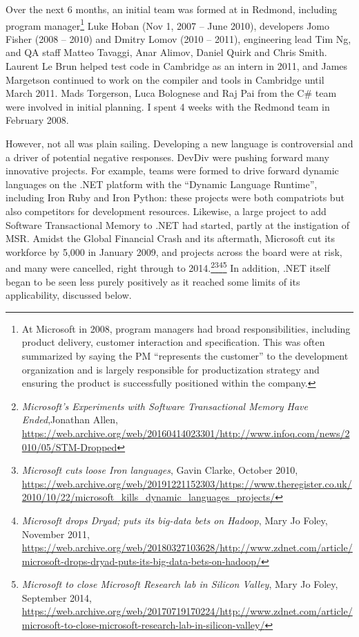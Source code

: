 \documentclass[acmsmall]{acmart}\settopmatter{}
\begin{document}
Over the next 6 months, an initial team was formed at in Redmond, including program
manager\footnote{At Microsoft in 2008, program managers had broad responsibilities, including product delivery,
customer interaction and specification. This was often summarized by saying the PM “represents the customer” to
the development organization and is largely responsible for productization strategy and ensuring the product is
successfully positioned within the company.} Luke Hoban  (Nov 1, 2007 -- June 2010), developers
Jomo Fisher (2008 -- 2010) and Dmitry Lomov (2010 -- 2011), engineering lead Tim Ng, and QA staff Matteo Tavaggi, Anar Alimov, Daniel Quirk and
Chris Smith.  Laurent Le Brun helped test code in Cambridge as an intern in 2011, and James Margetson
continued to work on the compiler and tools in Cambridge until March 2011.  Mads Torgerson, Luca Bolognese
and Raj Pai from the C\# team were involved in initial planning. I spent 4 weeks with the Redmond team in February 2008.

However, not all was plain sailing.  Developing a new language is controversial and a driver of potential
negative responses. DevDiv were pushing forward many innovative projects. For example, teams
were formed to drive forward dynamic languages on the .NET platform with the “Dynamic Language Runtime”, including
Iron Ruby and Iron Python: these projects were both compatriots but also competitors for development
resources. Likewise, a large project to add Software Transactional Memory to .NET had started, partly
at the instigation of MSR. Amidst the Global Financial Crash and its aftermath, Microsoft cut its workforce
by 5,000 in January 2009, and projects across the board were at risk, and many were cancelled, right
through to 2014.\footnote{\textit{Microsoft’s Experiments with Software Transactional Memory Have Ended},Jonathan Allen, \url{https://web.archive.org/web/20160414023301/http://www.infoq.com/news/2010/05/STM-Dropped}}\footnote{\textit{Microsoft cuts loose Iron languages}, Gavin Clarke, October 2010, \url{https://web.archive.org/web/20191221152303/https://www.theregister.co.uk/2010/10/22/microsoft_kills_dynamic_languages_projects/}}\footnote{\textit{Microsoft drops Dryad; puts its big-data bets on Hadoop}, Mary Jo Foley, November 2011,  \url{https://web.archive.org/web/20180327103628/http://www.zdnet.com/article/microsoft-drops-dryad-puts-its-big-data-bets-on-hadoop/}}\footnote{\textit{Microsoft to close Microsoft Research lab in Silicon Valley}, Mary Jo Foley, September 2014, \url{https://web.archive.org/web/20170719170224/http://www.zdnet.com/article/microsoft-to-close-microsoft-research-lab-in-silicon-valley/}}
In addition, .NET itself began to be seen less purely positively as it reached some limits of its applicability, discussed below.
\end{document}

